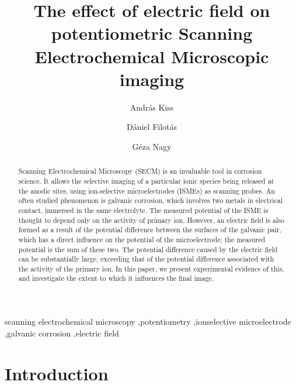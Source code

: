 \documentclass[3p]{elsarticle}
\begin{document}
\begin{frontmatter}

\title{The effect of electric field on potentiometric Scanning Electrochemical Microscopic imaging}
\author[akiss]{András Kiss}
\address[akiss, gnagy]{Department of General and Physical Chemistry, Faculty of Sciences, University of Pécs, 7624 Pécs, Ifjúság útja 6, Hungary}
\author[dfilotas]{Dániel Filotás}
\author[gnagy]{Géza Nagy}


\begin{abstract}

Scanning Electrochemical Microscopy (SECM) is an invaluable tool in corrosion science.
It allows the selective imaging of a particular ionic species being released at the anodic sites, using ion-selective microelectrodes (ISMEs) as scanning probes.
An often studied phenomenon is galvanic corrosion, which involves two metals in electrical contact, immersed in the same electrolyte.
The measured potential of the ISME is thought to depend only on the activity of primary ion.
However, an electric field is also formed as a result of the potential difference between the surfaces of the galvanic pair, which has a direct influence on the potential of the microelectrode; the measured potential is the sum of these two.
The potential difference caused by the electric field can be substantially large, exceeding that of the potential difference associated with the activity of the primary ion.
In this paper, we present experimental evidence of this, and investigate the extent to which it influences the final image. 
\end{abstract}
\begin{keyword}
	scanning electrochemical microscopy \sep potentiometry \sep ionselective microelectrode \sep galvanic corrosion \sep electric field
\end{keyword}
\end{frontmatter}

\section{Introduction}
\end{document}
